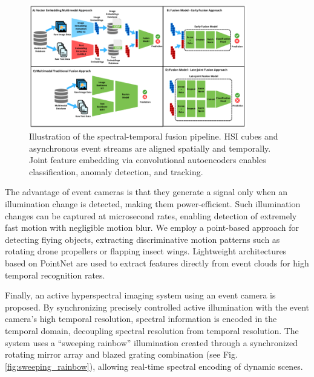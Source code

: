 \documentclass[conference]{IEEEtran}
\begin{document}
\begin{figure}[!t]
\centering
\includegraphics[width=0.85\textwidth]{Schematic-Representation-of-Multimodal-Fusion-Approaches-1A-depicts-the-traditional.png}
\caption{Illustration of the spectral-temporal fusion pipeline. HSI cubes and asynchronous event streams are aligned spatially and temporally. Joint feature embedding via convolutional autoencoders enables classification, anomaly detection, and tracking.}
\label{fig:fusion_pipeline}
\end{figure}

The advantage of event cameras is that they generate a signal only when an illumination change is detected, making them power-efficient. Such illumination changes can be captured at microsecond rates, enabling detection of extremely fast motion with negligible motion blur. We employ a point-based approach for detecting flying objects, extracting discriminative motion patterns such as rotating drone propellers or flapping insect wings. Lightweight architectures based on PointNet are used to extract features directly from event clouds for high temporal recognition rates.

Finally, an active hyperspectral imaging system using an event camera is proposed. By synchronizing precisely controlled active illumination with the event camera’s high temporal resolution, spectral information is encoded in the temporal domain, decoupling spectral resolution from temporal resolution. The system uses a “sweeping rainbow” illumination created through a synchronized rotating mirror array and blazed grating combination (see Fig. \ref{fig:sweeping_rainbow}), allowing real-time spectral encoding of dynamic scenes.
\end{document}
